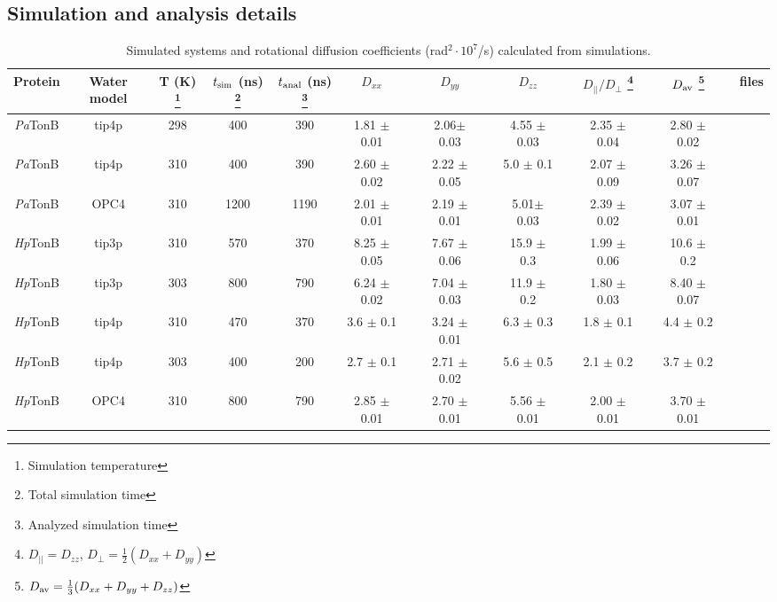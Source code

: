 \documentclass[pre,aps,floatfix,authordate1-4,twocolumn]{revtex4-1}
\begin{document}
\subsection{Simulation and analysis details}
\begin{table}[htb]
\centering
\caption{Simulated systems and rotational diffusion coefficients (rad$^2\cdot 10^7$/s) calculated from simulations.
}\label{ROTdiffCOEFFS}
\begin{tabular}{c c c c c c c c c c c c c c c c}
Protein     & Water model & T (K) \footnote{Simulation temperature}  &  $t_{\rm sim}$ (ns) \footnote{Total simulation time}  &  $t_{\rm anal}$ (ns) \footnote{Analyzed simulation time}  & $D_{xx}$ &&$D_{yy}$ &&$D_{zz}$ &&$D_{||}/D_\perp$ \footnote{$D_{||}=D_{zz}$, $D_\perp=\frac{1}{2}(D_{xx}+D_{yy})$} & &$D_{\rm av}$ \footnote{$D_{\rm av}=\frac{1}{3}(D_{xx}+D_{yy}+D_{zz} )$}& &files \\
\hline
{\it Pa}TonB      & tip4p       & 298    & 400                 &  390                 & 1.81 $\pm$ 0.01 && 2.06$\pm$ 0.03 && 4.55 $\pm$ 0.03 && 2.35 $\pm$ 0.04 && 2.80 $\pm$ 0.02 && \cite{PsTonB-tip4p-298K} \\
{\it Pa}TonB      & tip4p       & 310    & 400                 &  390                 &  2.60 $\pm$ 0.02 &&  2.22 $\pm$ 0.05& &  5.0  $\pm$ 0.1  & &  2.07 $\pm$ 0.09& &   3.26 $\pm$  0.07 && \cite{PsTonB-tip4p-310K}\\
{\it Pa}TonB      & OPC4        & 310    & 1200                &  1190                &  2.01 $\pm$ 0.01 && 2.19 $\pm$ 0.01 && 5.01$\pm$ 0.03 && 2.39 $\pm$ 0.02 && 3.07 $\pm$ 0.01 && \cite{PsTonB-OPC4-310K}  \\
{\it Hp}TonB      & tip3p       & 310    & 570           	 &  370                 & 8.25 $\pm$ 0.05 && 7.67 $\pm$ 0.06 && 15.9 $\pm$ 0.3 && 1.99 $\pm$ 0.06 &&  10.6 $\pm$ 0.2 &&  \cite{HpTonB-tip3p-310K} \\
{\it Hp}TonB      & tip3p       & 303    & 800           	 &  790                 & 6.24 $\pm$ 0.02 && 7.04 $\pm$ 0.03 && 11.9 $\pm$ 0.2 && 1.80 $\pm$ 0.03 && 8.40 $\pm$ 0.07 && \cite{HpTonB-tip3p-303K} \\
{\it Hp}TonB      & tip4p       & 310    & 470           	 &  370                 & 3.6 $\pm$ 0.1 && 3.24 $\pm$ 0.01 && 6.3 $\pm$ 0.3 && 1.8 $\pm$ 0.1 && 4.4 $\pm$ 0.2 && \cite{HpTonB-tip4p-310K} \\
{\it Hp}TonB      & tip4p       & 303    & 400           	 &  200                 & 2.7 $\pm$ 0.1 && 2.71 $\pm$ 0.02 && 5.6 $\pm$ 0.5 && 2.1 $\pm$ 0.2 && 3.7 $\pm$ 0.2 && \cite{HpTonB-tip4p-303K} \\
{\it Hp}TonB      & OPC4        & 310    & 800           	 &  790                 & 2.85 $\pm$ 0.01 && 2.70 $\pm$ 0.01 && 5.56 $\pm$ 0.01 && 2.00 $\pm$ 0.01 && 3.70 $\pm$ 0.01 && \cite{HpTonB-OPC4-310K} \\
\end{tabular}
\end{table}
\end{document}
